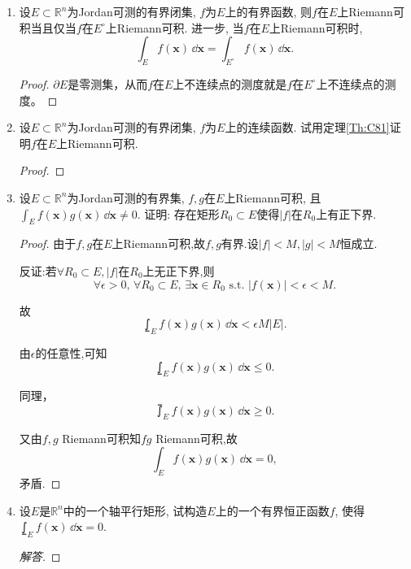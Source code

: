 \begin{quiza}
\begin{enumerate}
\item 设\(E\subset\mathbb{R}^n\)为Jordan可测的有界闭集, \(f\)为\(E\)上的有界函数, 
则\(f\)在\(E\)上Riemann可积当且仅当\(f\)在\(E^{\circ}\)上Riemann可积. 
进一步, 当\(f\)在\(E\)上Riemann可积时,
\[\int_E f(\boldsymbol{x})\,\dd\boldsymbol{x}
=\int_{E^\circ}f(\boldsymbol{x})\,\dd\boldsymbol{x}.\]
\begin{proof}
	$\partial E$是零测集，从而$f$在$E$上不连续点的测度就是$f$在$E^\circ$上不连续点的测度。
\end{proof}

\item 设\(E\subset\mathbb{R}^n\)为Jordan可测的有界闭集, \(f\)为\(E\)上的连续函数. 
试用定理\ref{Th:C81}证明\(f\)在\(E\)上Riemann可积.
\begin{proof}
	
\end{proof}

\item 设\(E\subset\mathbb{R}^n\)为Jordan可测的有界集, \(f,g\)在\(E\)上Riemann可积, 
且\(\int_Ef(\boldsymbol{x})g(\boldsymbol{x})\,\dd\boldsymbol{x}\ne 0\). 
证明: 存在矩形\(R_0\subset E\)使得\(|f|\)在\(R_0\)上有正下界.
\begin{proof}
由于\(f,g\)在\(E\)上Riemann可积,故\(f,g\)有界.设\(|f|<M,|g|<M\)恒成立.

反证:若\(\forall R_0 \subset E, |f|\)在\(R_0\)上无正下界,则
$$
\forall \epsilon>0,\, \forall R_0 \subset E,\, \exists \boldsymbol{x}\in R_0 \text{ s.t. } |f(\boldsymbol{x})|<\epsilon<M.
$$

故
$$\lowint_E f(\boldsymbol{x})g(\boldsymbol{x})\,\dd\boldsymbol{x}<\epsilon M |E|.$$

由$\epsilon$的任意性,可知$$\lowint_E f(\boldsymbol{x})g(\boldsymbol{x})\,\dd\boldsymbol{x}\le0.$$

同理，$$\upint_E f(\boldsymbol{x})g(\boldsymbol{x})\,\dd\boldsymbol{x}\ge0.$$

又由\(f,g\) Riemann可积知\(fg\) Riemann可积,故$$\int_E f(\boldsymbol{x})g(\boldsymbol{x})\,\dd\boldsymbol{x}=0,$$矛盾.
\end{proof}

\item 设\(E\)是\(\mathbb{R}^n\)中的一个轴平行矩形, 试构造\(E\)上的一个有界恒正函数\(f\), 
使得\(\lowint_Ef(\boldsymbol{x})\,\dd\boldsymbol{x}=0\).
\begin{proof}[解答]
	
\end{proof}
\end{enumerate}
\end{quiza}

